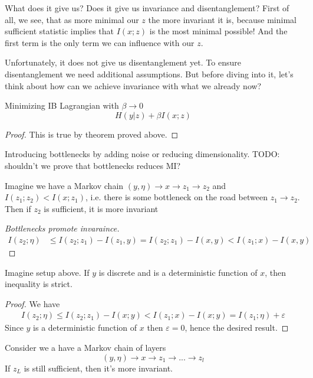 \documentclass{article}
\begin{document}
What does it give us? Does it give us invariance and disentanglement?
First of all, we see, that as more minimal our $z$ the more invariant it is, because minimal sufficient statistic implies that $I(x;z)$ is the most minimal possible!
And the first term is the only term we can influence with our $z$.

Unfortunately, it does not give us disentanglement yet.
To ensure disentanglement we need additional assumptions.
But before diving into it, let's think about how can we achieve invariance with what we already now?

\begin{corollary}
Minimizing IB Lagrangian with $\beta \to 0$
\[
H(y|z) + \beta I(x;z)
\]
\end{corollary}

\begin{proof}
This is true by theorem proved above.
\end{proof}

Introducing bottlenecks by adding noise or reducing dimensionality.
TODO: shouldn't we prove that bottlenecks reduces MI?
\begin{corollary}
Imagine we have a Markov chain $(y,\eta) \to x \to z_1 \to z_2$ and $I(z_1;z_2) < I(x; z_1)$, i.e. there is some bottleneck on the road between $z_1 \to z_2$. Then if $z_2$ is sufficient, it is more invariant    
\end{corollary}

\begin{proof}[Bottlenecks promote invaraince]
\begin{align*}
I(z_2;\eta) &\leq I(z_2;z_1) - I(z_1,y) = I(z_2; z_1) - I(x, y) < I(z_1; x) - I(x,y)
\end{align*}
\end{proof}

\begin{corollary}
Imagine setup above.
If $y$ is discrete and is a deterministic function of $x$, then inequality is strict.
\end{corollary}

\begin{proof}
We have
\[
\begin{split}
I(z_2; \eta) \leq I(z_2; z_1) - I(x;y) < I(z_1; x) - I(x;y) = I(z_1; \eta) + \varepsilon
\end{split}
\]
Since $y$ is a deterministic function of $x$ then $\varepsilon = 0$, hence the desired result.
\end{proof}

\begin{corollary}
Consider we a have a Markov chain of layers
\[
(y,\eta) \to x \to z_1 \to ... \to z_l
\]
If $z_L$ is still sufficient, then it's more invariant.
\end{corollary}
\end{document}
